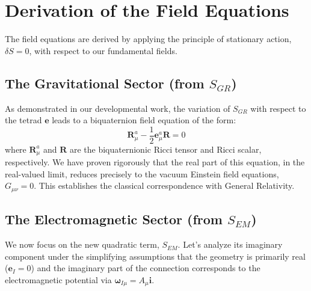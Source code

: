 \documentclass[11pt, a4paper]{article}
\begin{document}
\section{Derivation of the Field Equations}
The field equations are derived by applying the principle of stationary action, \( \delta S = 0 \), with respect to our fundamental fields.

\subsection{The Gravitational Sector (from \(S_{GR}\))}
As demonstrated in our developmental work, the variation of \( S_{GR} \) with respect to the tetrad \( \mathbf{e} \) leads to a biquaternion field equation of the form:
\begin{equation}
\mathbf{R}^a_\mu - \frac{1}{2} \mathbf{e}^a_\mu \mathbf{R} = 0
\end{equation}
where \( \mathbf{R}^a_\mu \) and \( \mathbf{R} \) are the biquaternionic Ricci tensor and Ricci scalar, respectively. We have proven rigorously that the real part of this equation, in the real-valued limit, reduces precisely to the vacuum Einstein field equations, \( G_{\mu\nu} = 0 \). This establishes the classical correspondence with General Relativity.

\subsection{The Electromagnetic Sector (from \(S_{EM}\))}
We now focus on the new quadratic term, \( S_{EM} \). Let's analyze its imaginary component under the simplifying assumptions that the geometry is primarily real (\( \mathbf{e}_I = 0 \)) and the imaginary part of the connection corresponds to the electromagnetic potential via \( \boldsymbol{\omega}_{I\mu} = A_\mu \mathbf{i} \).
\end{document}
